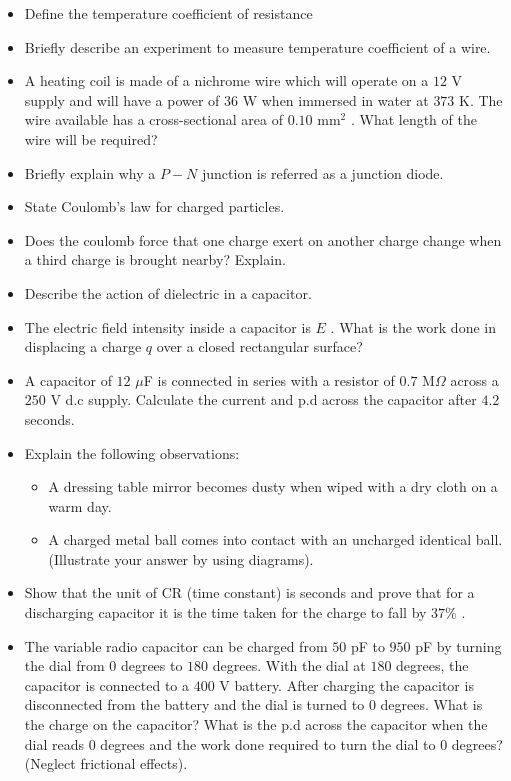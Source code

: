 \documentclass{article}
\begin{document}
\begin{itemize}
\begin{itemize}
\end{itemize}
\item Define the temperature coefficient of resistance
\item Briefly describe an experiment to measure temperature coefficient of a wire.
\item A heating coil is made of a nichrome wire which will operate on a $ 12$ V supply and will have a power of $ 36$ W when immersed in water at $ 373$ K. The wire available has a cross-sectional area of $ 0.10$ mm$ ^{2}$ . What length of the wire will be required? 
\item Briefly explain why a $ P-N$ junction is referred as a junction diode.
\item State Coulomb’s law for charged particles.
\item Does the coulomb force that one charge exert on another charge change when a third charge is brought nearby? Explain.
\item Describe the action of dielectric in a capacitor.
\item The electric field intensity inside a capacitor is $ E$ . What is the work done in displacing a charge $ q$ over a closed rectangular surface?
\item A capacitor of $ 12$ $\mu$F is connected in series with a resistor of $ 0.7$ M$ \Omega $ across a $ 250$ V d.c supply. Calculate the current and p.d across the capacitor after $ 4.2$ seconds.
\item Explain the following observations:
 \begin{itemize}
\item A dressing table mirror becomes dusty when wiped with a dry cloth on a warm day.
\item A charged metal ball comes into contact with an uncharged identical ball.  (Illustrate your answer by using diagrams).
\end{itemize}
\item Show that the unit of CR (time constant) is seconds and prove that for a discharging capacitor it is the time taken for the charge to fall by $ 37\%$ . 
\item The variable radio capacitor can be charged from $ 50$ pF to $ 950$ pF by turning the dial from $ 0$ degrees to $ 180$ degrees. With the dial at $ 180$ degrees, the capacitor is connected to a $ 400$ V battery. After charging the capacitor is disconnected from the battery and the dial is turned to $ 0$ degrees. What is the charge on the capacitor? What is the p.d across the capacitor when the dial reads $ 0$ degrees and the work done required to turn the dial to $ 0$ degrees? (Neglect frictional effects).

\end{itemize}
\end{document}
